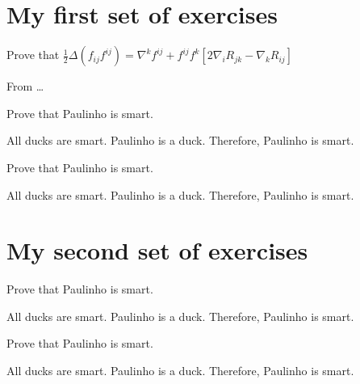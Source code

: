 \documentclass{article}
\begin{document}
\section{My first set of exercises}
\begin{exercise}
  Prove that $\frac{1}{2}\Delta(f_{ij}f^{ij})
  =\nabla^{k}f^{ij}+f^{ij}f^{k}[2\nabla_{i}R_{jk}-\nabla_{k}R_{ij}]$
\end{exercise}
\begin{solution}
  From \dots
\end{solution}

\begin{exercise}
  Prove that Paulinho is smart.
\end{exercise}
\begin{solution}
  All ducks are smart. Paulinho is a duck. Therefore, Paulinho is smart.
\end{solution}

\begin{exercise}
  Prove that Paulinho is smart.
\end{exercise}
\begin{solution}
  All ducks are smart. Paulinho is a duck. Therefore, Paulinho is smart.
\end{solution}

\section{My second set of exercises}
\begin{exercise}
  Prove that Paulinho is smart.
\end{exercise}
\begin{solution}
  All ducks are smart. Paulinho is a duck. Therefore, Paulinho is smart.
\end{solution}

\begin{exercise}
  Prove that Paulinho is smart.
\end{exercise}
\begin{solution}
  All ducks are smart. Paulinho is a duck. Therefore, Paulinho is smart.
\end{solution}
\end{document}
